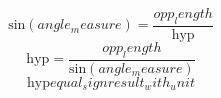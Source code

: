\[\text{{sin}}({angle_measure})=\frac{{{opp_length}}}{{\text{{{hyp}}}}}\]
\[\text{{{hyp}}}=\frac{{{opp_length}}}{{\text{{sin}}({angle_measure})}}\]
\[\text{{{hyp}}}{equal_sign}{result_with_unit}\]
